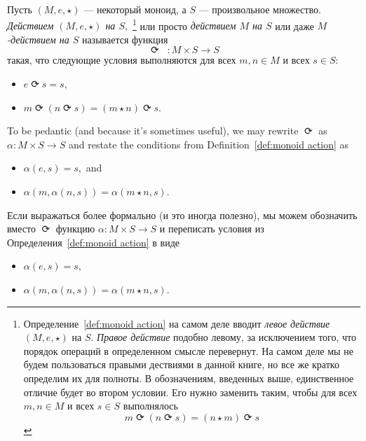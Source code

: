 \documentclass[../main/CT4S-EN-RU]{subfiles}
\begin{document}
\begin{definitionRUS}\label{def:monoid action}
Пусть $(M,e,{⋆})$ — некоторый моноид, а $S$ — произвольное множество. {\em Действием $(M,e,{⋆})$ на $S,$}%
\footnote{Определение~\ref{def:monoid action} на самом деле вводит {\em левое действие} $(M,e,{⋆})$ на $S.$ {\em Правое действие} подобно левому, за исключением того, что порядок операций в определенном смысле перевернут. На самом деле мы не будем пользоваться правыми дествиями в данной книге, но все же кратко определим их для полноты. В обозначениям, введенных выше, единственное отличие будет во втором условии. Его нужно заменить таким, чтобы для всех $m,n\in M$ и всех $s\in S$ выполнялось
$$m{⟳}(n{⟳} s)=(n{⋆} m){⟳} s$$}
или просто {\em действием $M$ на $S$} или даже {\em $M$-действием на $S$} называется функция $${⟳}\;\;\colon M\times S{→} S$$ такая, что следующие условия выполняются для всех $m,n\in M$ и всех $s\in S$:
\begin{itemize}
\item $e{⟳} s=s,$
\item $m{⟳}(n{⟳} s)=(m{⋆} n){⟳} s.$
\end{itemize}
\end{definitionRUS}

\begin{remarkENG}\label{rmk:monoid action}
To be pedantic (and because it's sometimes useful), we may rewrite ${⟳}$ as $\alpha\colon M\times S{→} S$ and restate the conditions from Definition~\ref{def:monoid action} as
\begin{itemize}
\item $\alpha(e,s)=s,$ and
\item $\alpha(m,\alpha(n,s))=\alpha(m{⋆} n,s).$
\end{itemize}
\end{remarkENG}

\begin{remarkRUS}\label{rmk:monoid action}
Если выражаться более формально (и это иногда полезно), мы можем обозначить вместо ${⟳}$ функцию $\alpha\colon M\times S{→} S$ и переписать условия из Определения~\ref{def:monoid action} в виде
\begin{itemize}
\item $\alpha(e,s)=s,$
\item $\alpha(m,\alpha(n,s))=\alpha(m{⋆} n,s).$
\end{itemize}
\end{remarkRUS}
\end{document}
